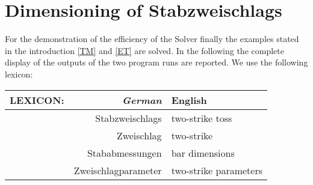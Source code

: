 \section{Dimensioning of Stabzweischlags}

For the demonstration of the efficiency of the Solver finally the examples stated in the introduction \ref{TM}  and \ref{ET} are solved. In the following  the complete display of the outputs of the two program runs are reported. We use the following lexicon:

\begin{center}
\begin {tabular} {r r | l  }
{\sf LEXICON:} & {\it\color{black} German} & {\color{blue} English }  \\
\hline
   & Stabzweischlags & \color{blue} two-strike toss \\
     &  Zweischlag &  \color{blue} two-strike \\
     &  Stababmessungen &  \color{blue} bar dimensions \\
     &  Zweischlagparameter &  \color{blue} two-strike parameters 
\end {tabular}
\end{center}



